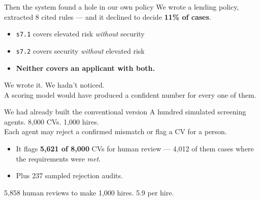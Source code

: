 \documentclass[aspectratio=169,11pt]{beamer}
\begin{document}
\begin{frame}{Then the system found a hole in our own policy}
  \vspace{1em}
  We wrote a lending policy, extracted 8 cited rules --- and it declined to
  decide \textbf{11\% of cases}.
  \vspace{1.2em}
  \begin{itemize}
    \setlength\itemsep{.5em}
    \item \texttt{s7.1} covers elevated risk \emph{without} security
    \item \texttt{s7.2} covers security \emph{without} elevated risk
    \item \textbf{\color{amber}Neither covers an applicant with both.}
  \end{itemize}
  \vspace{1.2em}
  \pause
  \begin{center}
    We wrote it. We hadn't noticed.\\[.5em]
    {\color{muted}A scoring model would have produced a confident number for
    every one of them.}
  \end{center}
\end{frame}

\begin{frame}{We had already built the conventional version}
  \vspace{.9em}
  A hundred simulated screening agents. 8,000 CVs. 1,000 hires.\\
  Each agent may reject a confirmed mismatch or flag a CV for a person.
  \vspace{1.3em}
  \begin{itemize}
    \setlength\itemsep{.8em}
    \item It flags \textbf{5,621 of 8,000} CVs for human review --- 4,012 of them
      cases where the requirements were \emph{met}.
    \item Plus 237 sampled rejection audits.
  \end{itemize}
  \vspace{1.2em}
  \pause
  \begin{center}\color{amber}\large
    5,858 human reviews to make 1,000 hires. 5.9 per hire.
  \end{center}
\end{frame}
\end{document}
